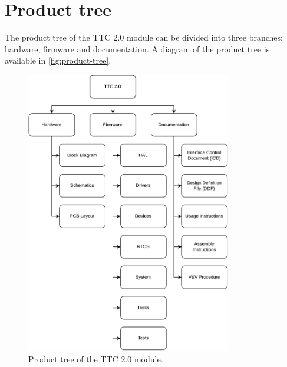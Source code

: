 \section{Product tree}

The product tree of the TTC 2.0 module can be divided into three branches: hardware, firmware and documentation. A diagram of the product tree is available in \autoref{fig:product-tree}.

\begin{figure}[!ht]
    \begin{center}
        \includegraphics[width=0.8\textwidth]{figures/product-tree.pdf}
        \caption{Product tree of the TTC 2.0 module.}
        \label{fig:product-tree}
    \end{center}
\end{figure}